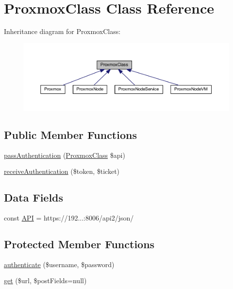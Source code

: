 \hypertarget{class_proxmox_class}{}\section{Proxmox\+Class Class Reference}
\label{class_proxmox_class}


Inheritance diagram for Proxmox\+Class\+:
\nopagebreak
\begin{figure}[H]
\begin{center}
\leavevmode
\includegraphics[width=350pt]{class_proxmox_class__inherit__graph}
\end{center}
\end{figure}
\subsection*{Public Member Functions}
\begin{DoxyCompactItemize}
\item 
\hyperlink{class_proxmox_class_af6d6e365b1529fabec975838b89411e1}{pass\+Authentication} (\hyperlink{class_proxmox_class}{Proxmox\+Class} \$api)
\item 
\hyperlink{class_proxmox_class_a98cee58b0d7b97b3959a09f529cfbb50}{receive\+Authentication} (\$token, \$ticket)
\end{DoxyCompactItemize}
\subsection*{Data Fields}
\begin{DoxyCompactItemize}
\item 
const \hyperlink{class_proxmox_class_ad629fa048bd788fc4a4ed613628423cb}{A\+P\+I} = \textquotesingle{}https\+://192...\+:8006/api2/json/\textquotesingle{}
\end{DoxyCompactItemize}
\subsection*{Protected Member Functions}
\begin{DoxyCompactItemize}
\item 
\hyperlink{class_proxmox_class_aee8894dc905620587c994c017f9092cc}{authenticate} (\$username, \$password)
\item 
\hyperlink{class_proxmox_class_a06921d906d966f332513c748b93b86d0}{get} (\$url, \$post\+Fields=null)
\end{DoxyCompactItemize}
